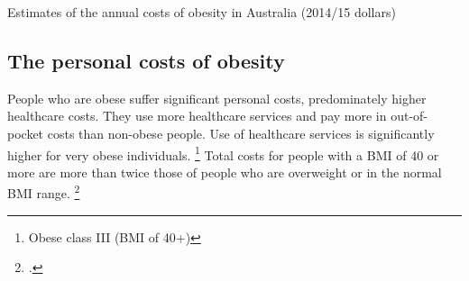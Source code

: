 \documentclass[embargoed]{grattan}
\begin{document}
\begin{table}
\caption{Estimates of the annual costs of obesity in Australia (2014/15 dollars)}




\end{table}

\subsection{The personal costs of obesity }\label{the-personal-costs-of-obesity}

People who are obese suffer significant personal costs, predominately higher healthcare costs.
They use more healthcare services and pay more in out-of-pocket costs than non-obese people.
Use of healthcare services is significantly higher for very obese individuals.%
\footnote{Obese class III (BMI of 40+)} Total costs for people with a BMI of 40 or more are more than twice those of people who are overweight or in the normal BMI range.%
\footcites{PwC2015Weighingcostobesity}{Park2012impactchildhoodobesity}{Australia2014NoTimeWeight}
\end{document}
